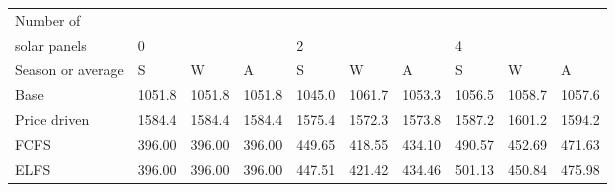 \begin{table}[h] 
\centering 
\begin{tabular}{l|lll|lll|lll}Number of \\ solar panels&0& & &2& & &4& & \\ \hline 
Season or average & S & W & A & S & W & A & S & W & A \\ \hline 
Base&1051.8&1051.8&1051.8&1045.0&1061.7&1053.3&1056.5&1058.7&1057.6 \\ 
Price driven&1584.4&1584.4&1584.4&1575.4&1572.3&1573.8&1587.2&1601.2&1594.2 \\ 
FCFS&396.00&396.00&396.00&449.65&418.55&434.10&490.57&452.69&471.63 \\ 
ELFS&396.00&396.00&396.00&447.51&421.42&434.46&501.13&450.84&475.98 \\ 
\end{tabular} 
\end{table}